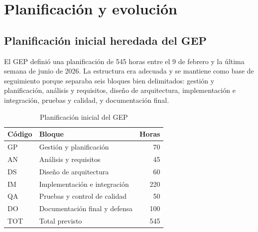 \chapter{Planificación y evolución}

\section{Planificación inicial heredada del GEP}
El GEP definió una planificación de 545 horas entre el 9 de febrero y la última semana de junio de 2026. La estructura era adecuada y se mantiene como base de seguimiento porque separaba seis bloques bien delimitados: gestión y planificación, análisis y requisitos, diseño de arquitectura, implementación e integración, pruebas y calidad, y documentación final.

\begin{table}[H]
  \centering
  \caption{Planificación inicial del GEP}
  \label{tab:planificacion-inicial-gep}
  \begin{tabularx}{\textwidth}{lXr}
    \toprule
    Código & Bloque & Horas \\
    \midrule
    GP & Gestión y planificación & 70 \\
    AN & Análisis y requisitos & 45 \\
    DS & Diseño de arquitectura & 60 \\
    IM & Implementación e integración & 220 \\
    QA & Pruebas y control de calidad & 50 \\
    DO & Documentación final y defensa & 100 \\
    \midrule
    TOT & Total previsto & 545 \\
    \bottomrule
  \end{tabularx}
\end{table}

